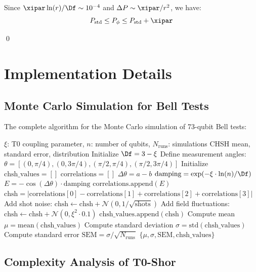Since $\xipar \ln(r)/\Df \sim 10^{-4}$ and $\Delta P \sim \xipar/r^2$, we have:
\[
P_{\text{std}} \leq P_{\phi} \leq P_{\text{std}} + \xipar
\]

\qed

\section{Implementation Details}
\label{app:implementation}

\subsection{Monte Carlo Simulation for Bell Tests}
\label{app:monte_carlo}

The complete algorithm for the Monte Carlo simulation of 73-qubit Bell tests:

\begin{algorithm}[H]
	\caption{Monte Carlo Bell Test Simulation (Corrected Version)}
	\begin{algorithmic}[1]
		\REQUIRE $\xi$: T0 coupling parameter, $n$: number of qubits, $N_{\text{runs}}$: simulations
		\ENSURE CHSH mean, standard error, distribution
		\STATE Initialize $\Df = 3 - \xi$
		\STATE Define measurement angles: $\theta = [(0, \pi/4), (0, 3\pi/4), (\pi/2, \pi/4), (\pi/2, 3\pi/4)]$
		\STATE Initialize $\text{chsh\_values} = []$
		\STATE $\text{correlations} = []$
		\STATE $\Delta\theta = a - b$
		\STATE $\text{damping} = \exp(-\xi \cdot \ln(n) / \Df)$
		\STATE $E = -\cos(\Delta\theta) \cdot \text{damping}$ 
		\STATE $\text{correlations.append}(E)$
		\ENDFOR
		\STATE $\text{chsh} = |\text{correlations}[0] - \text{correlations}[1] + \text{correlations}[2] + \text{correlations}[3]|$
		\STATE Add shot noise: $\text{chsh} \leftarrow \text{chsh} + \mathcal{N}(0, 1/\sqrt{\text{shots}})$
		\STATE Add field fluctuations: $\text{chsh} \leftarrow \text{chsh} + \mathcal{N}(0, \xi^2 \cdot 0.1)$
		\STATE $\text{chsh\_values.append}(\text{chsh})$
		\ENDFOR
		\STATE Compute mean $\mu = \text{mean}(\text{chsh\_values})$
		\STATE Compute standard deviation $\sigma = \text{std}(\text{chsh\_values})$
		\STATE Compute standard error $\text{SEM} = \sigma / \sqrt{N_{\text{runs}}}$
		\RETURN $\{\mu, \sigma, \text{SEM}, \text{chsh\_values}\}$
	\end{algorithmic}
\end{algorithm}

\subsection{Complexity Analysis of T0-Shor}
\label{app:complexity}

